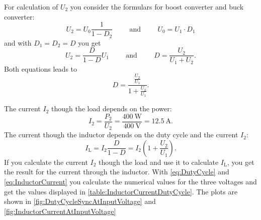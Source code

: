 \begin{solutionblock}
    For calculation of $U_\mathrm{2}$ you consider the formulars for boost converter and buck converter: 
    \begin{equation}
        U_\mathrm{2}=U_0 \frac{1}{1-D_\mathrm{2}} 
        \hspace{1cm} \mathrm{and} \hspace{1cm}  
        U_0=U_\mathrm{1} \cdot D_\mathrm{1}
    \end{equation}
    and with $D_\mathrm{1}=D_\mathrm{2}=D$ you get
    \begin{equation}
        U_\mathrm{2}=\frac{D}{1-D} U_\mathrm{1}
        \hspace{1cm} \mathrm{and} \hspace{1cm}
        D=\frac{U_\mathrm{2}}{U_\mathrm{1}+U_\mathrm{2}}.
    \end{equation}
    Both equations leads to
    \begin{equation}
        D = \frac{\frac{U_\mathrm{2}}{U_\mathrm{1}}} {1+{\frac{U_\mathrm{2}}{U_\mathrm{1}}}}.
        \label{eq:DutyCycle}
    \end{equation}   
\end{solutionblock}

\begin{solutionblock}
    The current $I_\mathrm{2}$ though the load depends on the power:
    \begin{equation}
        I_\mathrm{2}=\frac{P_\mathrm{2}}{U_\mathrm{2}} = \frac{\SI{400}{\watt}}{\SI{400}{\volt}}=\SI{12.5}{\ampere}.
    \end{equation}
    The current though the inductor depends on the duty cycle and the current $I_\mathrm{2}$:
    \begin{equation}
        I_\mathrm{L}=I_\mathrm{2} \frac{D}{1-D} = I_\mathrm{2} \left(1+\frac{U_\mathrm{2}}{U_\mathrm{1}} \right).
        \label{eq:InductorCurrent}
    \end{equation}
    If you calculate the current $I_\mathrm{2}$ though the load and use it to calculate $I_\mathrm{L}$,
     you get the result for the current through the inductor.
    With \eqref{eq:DutyCycle} and \eqref{eq:InductorCurrent} you calculate the numerical values for the three voltages
    and get the values displayed in \autoref{table:InductorCurrentDutyCycle}. The plots are shown in 
    \autoref{fig:DutyCycleSyncAtInputVoltage} and \autoref{fig:InductorCurrentAtInputVoltage}

    
    
    

\end{solutionblock}
 

